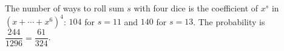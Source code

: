 The number of ways to roll sum $s$ with four dice is the coefficient of $x^s$ in $(x+\cdots+x^6)^4$: $104$ for $s=11$ and $140$ for $s=13$. The probability is $\dfrac{244}{1296}=\boxed{\dfrac{61}{324}}$.
